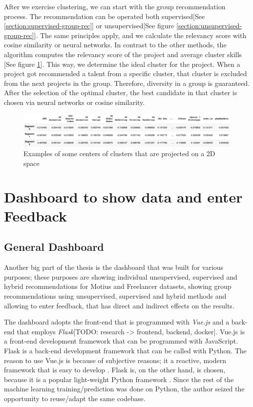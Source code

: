 After we exercise clustering, we can start with the group recommendation process. The recommendation can be operated both supervised[See \ref{section:supervised-group-rec}] or unsupervised[See figure \ref{section:unsupervised-group-rec}]. The same principles apply, and we calculate the relevancy score with cosine similarity or neural networks. In contrast to the other methods, the algorithm computes the relevancy score of the project and average cluster skills [See figure \ref{fig:cluster-centers-matrix}]. This way, we determine the ideal cluster for the project. When a project got recommended a talent from a specific cluster, that cluster is excluded from the next projects in the group. Therefore, diversity in a group is guaranteed. After the selection of the optimal cluster, the best candidate in that cluster is chosen via neural networks or cosine similarity.

 \begin{figure}[!ht]
	\centering
	\includegraphics[width=\textwidth]{figures/ClusterCentersMatrix.png}
	\caption{Examples of some centers of clusters that are projected on a 2D space}
	\label{fig:cluster-centers-matrix}
\end{figure}



\section{Dashboard to show data and enter Feedback}

\subsection{General Dashboard}

Another big part of the thesis is the dashboard that was built for various purposes; these purposes are showing individual unsupervised, supervised and hybrid recommendations for Motius and Freelancer datasets, showing group recommendations using unsupervised, supervised and hybrid methods and allowing to enter feedback, that has direct and indirect effects on the results.

The dashboard adopts the front-end that is programmed with \textit{Vue.js} and a back-end that employs \textit{Flask}[TODO: research -> frontend, backend, docker]. Vue.js is a front-end development framework that can be programmed with JavaScript. Flask is a back-end development framework that can be called with Python. The reason to use Vue.js is because of subjective reasons; it a reactive, modern framework that is easy to develop \cite{you2018vue}. Flask is, on the other hand, is chosen, because it is a popular light-weight Python framework \cite{grinberg2018flask}. Since the rest of the machine learning training/prediction was done on Python, the author seized the opportunity to reuse/adapt the same codebase. 

